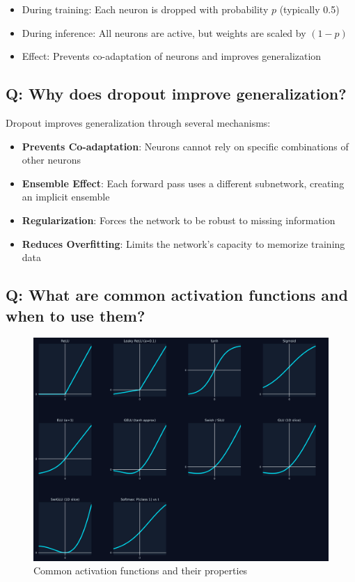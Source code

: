 \begin{itemize}
	\item During training: Each neuron is dropped with probability $p$ (typically 0.5)
	\item During inference: All neurons are active, but weights are scaled by $(1-p)$
	\item Effect: Prevents co-adaptation of neurons and improves generalization
\end{itemize}

\subsection*{\textcolor{primaryteal}{Q: Why does dropout improve generalization?}}
Dropout improves generalization through several mechanisms:

\begin{itemize}
	\item \textbf{Prevents Co-adaptation}: Neurons cannot rely on specific combinations of other neurons
	\item \textbf{Ensemble Effect}: Each forward pass uses a different subnetwork, creating an implicit ensemble
	\item \textbf{Regularization}: Forces the network to be robust to missing information
	\item \textbf{Reduces Overfitting}: Limits the network's capacity to memorize training data
\end{itemize}

\subsection*{\textcolor{primaryteal}{Q: What are common activation functions and when to use them?}}
\begin{figure}[H]
	\centering
	\includegraphics[width=1\textwidth]{images/activation.png}
	\caption{Common activation functions and their properties}
\end{figure}

